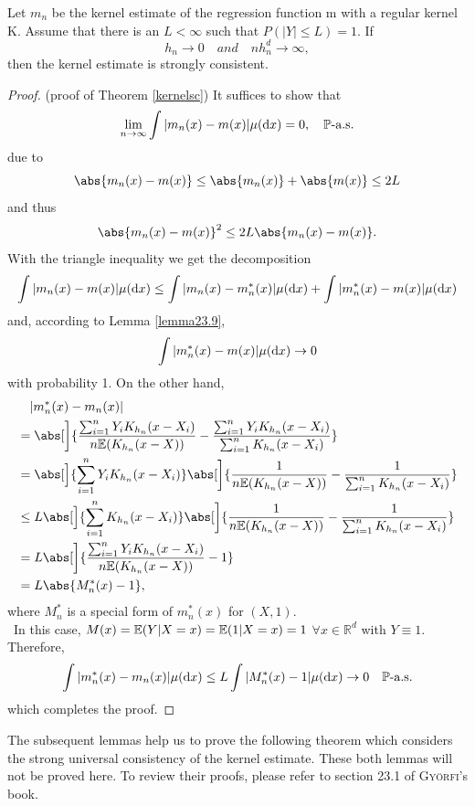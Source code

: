 \begin{theorem} \label{kernelsc}
Let $m_n$ be the kernel estimate of the regression function m with a regular kernel K. Assume that there is an $L<\infty$ such that $P(|Y| \leq L) = 1.$ If \[h_n \to 0 \quad and \quad nh_n^d \to \infty,\] then the kernel estimate is strongly consistent.
\end{theorem}
\begin{proof}
(proof of Theorem \ref{kernelsc}) It suffices to show that \[\lim_{n\to\infty} \int |m_n(x)-m(x)| \mu(\mathop{}\!\mathrm{d}{x}) = 0,\quad \mathbb{P}\text{-a.s.}\] due to
\[
    \abs{m_n(x) - m(x)} \leq \abs{m_n(x)} + \abs{m(x)} \leq 2L
\]
and thus
\[
    \abs{m_n(x) - m(x)}^2 \leq 2L \abs{m_n(x) - m(x)}.
\]
With the triangle inequality we get the decomposition \[\int |m_n(x)-m(x)| \mu(\diff{x}) \leq \int |m_n(x)-m_n^*(x)| \mu(\diff{x}) + \int |m_n^*(x)-m(x)| \mu(\diff{x})\]
and, according to Lemma \ref{lemma23.9}, \[\int |m_n^*(x)-m(x)| \mu(\mathop{}\!\mathrm{d}{x}) \to 0 \] with probability 1.
On the other hand, 
\begin{align*}
&\quad |m_n^*(x)-m_n(x)| \\
&= \abs[\bigg]{\frac{\sum_{i=1}^{n}Y_i K_{h_n}(x-X_i)}{n\ev{K_{h_n}(x-X)}} - 
\frac{\sum_{i=1}^{n}Y_i K_{h_n}(x-X_i)}{\sum_{i=1}^{n}K_{h_n}(x-X_i)}} \\
&= \abs[\Big]{\sum_{i=1}^{n}Y_i K_{h_n}(x-X_i)}
\abs[\bigg]{\frac{1}{n\ev{K_{h_n}(x-X)}} - \frac{1}{\sum_{i=1}^{n}K_{h_n}(x-X_i)}} \\
&\leq L \abs[\Big]{\sum_{i=1}^{n}K_{h_n}(x-X_i)}
\abs[\bigg]{\frac{1}{n\ev{K_{h_n}(x-X)}} - \frac{1}{\sum_{i=1}^{n}K_{h_n}(x-X_i)}} \\
&= L \abs[\bigg]{\frac{\sum_{i=1}^{n}Y_i K_{h_n}(x-X_i)}{n\ev{K_{h_n}(x-X)}} - 1} \\
&= L \abs{M_n^*(x)-1},
\end{align*}
where $M_n^*$ is a special form of $m_n^*(x)$ for $(X,1)$. \\\
In this case, $M(x) = \mathbb{E}\!\left(Y|X=x\right) = \mathbb{E}\!\left(1|X=x\right) = 1$ $ \forall x \in \mathbb{R}^d$ with $Y \equiv 1$.
Therefore, 
\[
\int|m_n^*(x)-m_n(x)| \mu(\diff{x}) \leq L \int |M_n^*(x)-1| \mu(\diff{x}) \to 0 \quad \mathbb{P}\text{-a.s.}
\]
which completes the proof.
\end{proof}

The subsequent lemmas help us to prove the following theorem which considers the strong universal consistency of the kernel estimate. These both lemmas will not be proved here. To review their proofs, please refer to section 23.1 of \textsc{Györfi}'s book.

